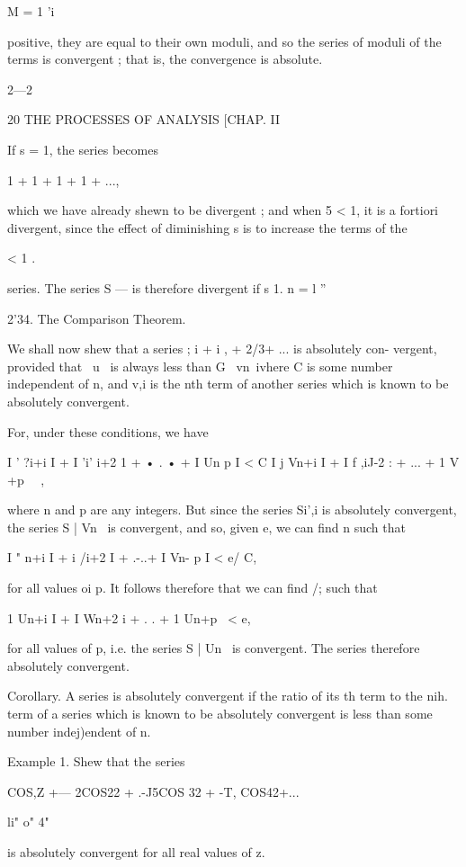 M = 1 'i 

positive, they are equal to their own moduli, and so the series of moduli of 
the terms is convergent ; that is, the convergence is absolute. 

2—2 



20 THE PROCESSES OF ANALYSIS [CHAP. II 

If s = 1, the series becomes 

1 + 1 + 1 + 1 + ..., 

which we have already shewn to be divergent ; and when 5 < 1, it is a fortiori 
divergent, since the effect of diminishing s is to increase the terms of the 

<  1 . 

series. The series S — is therefore divergent if s   1. 
n = l '' 

2'34. The Comparison Theorem. 

We shall now shew that a series ; i + i , + 2/3+ ... is absolutely con- 
vergent, provided that \ u  \ is always less than G \ vn\, ivhere C is some number 
independent of n, and v,i is the nth term of another series which is known to 
be absolutely convergent. 

For, under these conditions, we have 

I ' ?i+i I + I 'i' i+2 1 + • . • + I Un p I < C I j Vn+i I + I f ,iJ-2 : + ... + 1 V +p \ \ , 

where n and p are any integers. But since the series Si',i is absolutely 
convergent, the series S | Vn \ is convergent, and so, given e, we can find n 
such that 

I " n+i I + i  /i+2 I + .-..+ I Vn- p I < e/ C, 

for all values oi p. It follows therefore that we can find /; such that 

1 Un+i I + I Wn+2 i +   . . + 1 Un+p \ < e, 

for all values of p, i.e. the series S | Un \ is convergent. The series %
therefore absolutely convergent. 

Corollary. A series is absolutely convergent if the ratio of its  th term to the nih. 
term of a series which is known to be absolutely convergent is less than some number 
indej)endent of n. 

Example 1. Shew that the series 

COS,Z +— 2COS22 + .-J5COS 32 + -T, COS42+... 

li" o" 4" 

is absolutely convergent for all real values of z. 


